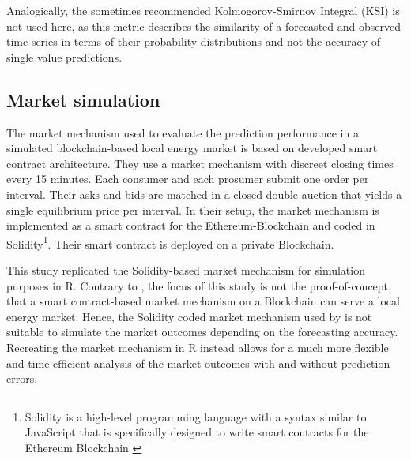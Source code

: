 Analogically, the sometimes recommended Kolmogorov-Smirnov Integral (KSI) \citep{Espinar:2009} is not used here, as this metric describes the similarity of a forecasted and observed time series in terms of their probability distributions and not the accuracy of single value predictions.




\subsection{Market simulation} \label{Sec:Method;Subsec:Market}

The market mechanism used to evaluate the prediction performance in a simulated blockchain-based local energy market is based on \cites{Mengelkamp:2018a} developed smart contract architecture. They use a market mechanism with discreet closing times every 15 minutes. Each consumer and each prosumer submit one order per interval. Their asks and bids are matched in a closed double auction that yields a single equilibrium price per interval. In their setup, the market mechanism is implemented as a smart contract for the Ethereum-Blockchain and coded in Solidity\footnote{Solidity is a high-level programming language with a syntax similar to JavaScript that is specifically designed to write smart contracts for the Ethereum Blockchain \citetext{see \citet{Ethereum:2018doc} for details}}. Their smart contract is deployed on a private Blockchain.

This study replicated the Solidity-based market mechanism for simulation purposes in R. Contrary to \citet{Mengelkamp:2018a}, the focus of this study is not the proof-of-concept, that a smart contract-based market mechanism on a Blockchain can serve a local energy market. Hence, the Solidity coded market mechanism used by \citet{Mengelkamp:2018a} is not suitable to simulate the market outcomes depending on the forecasting accuracy. Recreating the market mechanism in R instead allows for a much more flexible and time-efficient analysis of the market outcomes with and without prediction errors.


